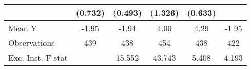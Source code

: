 {\begin{tabular}{l*{5}{c}}
            &     (0.732)         &     (0.493)         &     (1.326)         &     (0.633)         &                     \\
\midrule
Mean Y      &       -1.95         &       -1.94         &        4.00         &        4.29         &       -1.95         \\
Observations&         439         &         438         &         454         &         438         &         422         \\
Exc. Inst. F-stat&                     &      15.552         &      43.743         &       5.408         &       4.193         \\
\bottomrule
\end{tabular}
}
